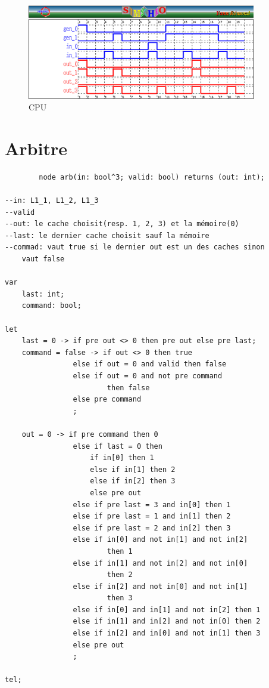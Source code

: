 \documentclass[a4paper,11pt]{report}
\begin{document}
	\begin{figure}[!htbp]
		\centering
		\includegraphics[width = 10cm]{cpu_diag.png}
		\caption{CPU}
	\end{figure}
	
\chapter{Arbitre}
	\begin{framed}
		\begin{verbatim}
		node arb(in: bool^3; valid: bool) returns (out: int);

--in: L1_1, L1_2, L1_3
--valid
--out: le cache choisit(resp. 1, 2, 3) et la mémoire(0)
--last: le dernier cache choisit sauf la mémoire
--commad: vaut true si le dernier out est un des caches sinon 
	vaut false

var
    last: int;
    command: bool;

let
    last = 0 -> if pre out <> 0 then pre out else pre last;
    command = false -> if out <> 0 then true
                else if out = 0 and valid then false
                else if out = 0 and not pre command 
                		then false
                else pre command
                ;

    out = 0 -> if pre command then 0
                else if last = 0 then
                    if in[0] then 1
                    else if in[1] then 2
                    else if in[2] then 3
                    else pre out
                else if pre last = 3 and in[0] then 1
                else if pre last = 1 and in[1] then 2
                else if pre last = 2 and in[2] then 3
                else if in[0] and not in[1] and not in[2] 
                		then 1
                else if in[1] and not in[2] and not in[0] 
                		then 2
                else if in[2] and not in[0] and not in[1] 
                		then 3
                else if in[0] and in[1] and not in[2] then 1
                else if in[1] and in[2] and not in[0] then 2
                else if in[2] and in[0] and not in[1] then 3
                else pre out
                ;

tel;
		\end{verbatim}
	\end{framed}
	
\end{document}
